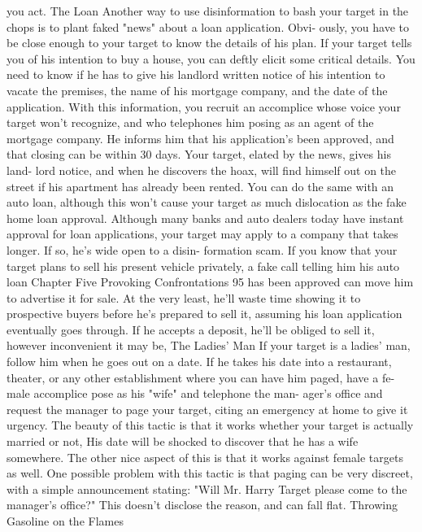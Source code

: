 \documentclass{book}
\begin{document}
you act. 
The Loan 
Another way to use disinformation to bash your target in the 
chops is to plant faked "news" about a loan application. Obvi- 
ously, you have to be close enough to your target to know the 
details of his plan. 
If your target tells you of his intention to buy a house, you 
can deftly elicit some critical details. You need to know if he 
has to give his landlord written notice of his intention to vacate 
the premises, the name of his mortgage company, and the date 
of the application. 
With this information, you recruit an accomplice whose 
voice your target won't recognize, and who telephones him 
posing as an agent of the mortgage company. He informs him 
that his application's been approved, and that closing can be 
within 30 days. Your target, elated by the news, gives his land- 
lord notice, and when he discovers the hoax, will find himself 
out on the street if his apartment has already been rented. 
You can do the same with an auto loan, although this won't 
cause your target as much dislocation as the fake home loan 
approval. Although many banks and auto dealers today have 
instant approval for loan applications, your target may apply to 
a company that takes longer. If so, he's wide open to a disin- 
formation scam. If you know that your target plans to sell his 
present vehicle privately, a fake call telling him his auto loan 
Chapter Five 
Provoking Confrontations 
95 
has been approved can move him to advertise it for sale. At the 
very least, he'll waste time showing it to prospective buyers 
before he's prepared to sell it, assuming his loan application 
eventually goes through. If he accepts a deposit, he'll be obliged 
to sell it, however inconvenient it may be, 
The Ladies’ Man 
If your target is a ladies' man, follow him when he goes out 
on a date. If he takes his date into a restaurant, theater, or any 
other establishment where you can have him paged, have a fe- 
male accomplice pose as his "wife" and telephone the man- 
ager’s office and request the manager to page your target, citing 
an emergency at home to give it urgency. The beauty of this 
tactic is that it works whether your target is actually married or 
not, His date will be shocked to discover that he has a wife 
somewhere. The other nice aspect of this is that it works against 
female targets as well. 
One possible problem with this tactic is that paging can be 
very discreet, with a simple announcement stating: "Will Mr. 
Harry Target please come to the manager's office?" This doesn't 
disclose the reason, and can fall flat. 
Throwing Gasoline on the Flames 
\end{document}
